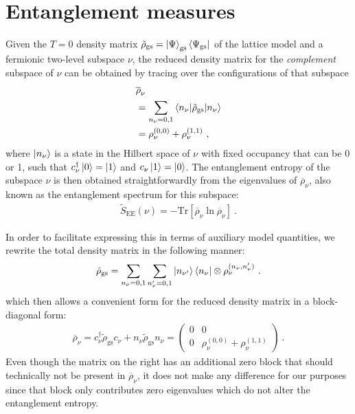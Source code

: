 \documentclass[reprint,hidelinks]{revtex4-2}
\begin{document}
\section{Entanglement measures}

Given the \(T=0\) density matrix \(\tilde\rho_\text{gs} = \ket{\Psi}_\text{gs}\bra{{\Psi}_\text{gs}}\) of the lattice model and a fermionic two-level subspace \(\nu\), the reduced density matrix for the {\it complement} subspace of \(\nu\) can be obtained by tracing over the configurations of that subspace
\begin{equation}\begin{aligned}
	&\overline\rho_{\nu} \\
	&= \sum_{n_{\nu}=0,1}\braket{n_{\nu}|\tilde\rho_\text{gs}|n_{\nu}}\\
	&= \rho_{\nu}^{(0,0)} + \rho_{\nu}^{(1,1)}~,
\end{aligned}\end{equation}
where \(\ket{n_{\nu}}\) is a state in the Hilbert space of \(\nu\) with fixed occupancy that can be 0 or 1, such that \(c^\dagger_\nu\ket{0}=\ket{1}\) and \(c_\nu\ket{1}=\ket{0}\). The entanglement entropy of the subspace \(\nu\) is then obtained straightforwardly from the eigenvalues of \(\overline\rho_{\nu}\), also known as the entanglement spectrum for this subspace:
\begin{equation}\begin{aligned}
	\tilde S_\text{EE}(\nu) = -\text{Tr}\left[\overline\rho_{\nu}\ln \overline\rho_{\nu}\right]  ~.
\end{aligned}\end{equation}

In order to facilitate expressing this in terms of auxiliary model quantities, we rewrite the total density matrix in the following manner:
\begin{equation}\begin{aligned}
	\tilde\rho_\text{gs} = \sum_{n_\nu=0,1}\sum_{n_\nu^\prime=0,1}\ket{n_{\nu^\prime}}\bra{n_{\nu}}\otimes\rho_\nu^{(n_\nu, n_\nu^\prime)}~.
\end{aligned}\end{equation}
which then allows a convenient form for the reduced density matrix in a block-diagonal form:
\begin{equation}\begin{aligned}
	\overline\rho_{\nu} = c^\dagger_\nu \tilde\rho_\text{gs} c_\nu + n_\nu \tilde\rho_\text{gs} n_\nu = \begin{pmatrix} 0 & 0 \\ 0 & \rho_{\nu}^{(0,0)} + \rho_{\nu}^{(1,1)} \end{pmatrix} ~.
\end{aligned}\end{equation}
Even though the matrix on the right has an additional zero block that should technically not be present in \(\overline\rho_{\nu}\), it does not make any difference for our purposes since that block only contributes zero eigenvalues which do not alter the entanglement entropy. 
\end{document}
